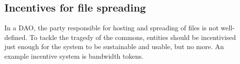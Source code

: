 \subsection{Incentives for file spreading}
In a DAO, the party responsible for hosting and spreading of files is not well-defined. To tackle the tragedy of the commons, entities should be incentivised just enough for the system to be sustainable and usable, but no more. An example incentive system is bandwidth tokens\cite{Vos2018ABM}.

